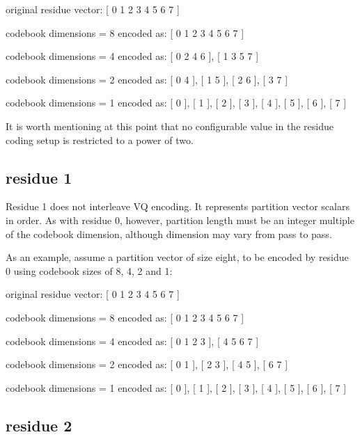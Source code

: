 \begin{programlisting}

            original residue vector: [ 0 1 2 3 4 5 6 7 ]

codebook dimensions = 8  encoded as: [ 0 1 2 3 4 5 6 7 ]

codebook dimensions = 4  encoded as: [ 0 2 4 6 ], [ 1 3 5 7 ]

codebook dimensions = 2  encoded as: [ 0 4 ], [ 1 5 ], [ 2 6 ], [ 3 7 ]

codebook dimensions = 1  encoded as: [ 0 ], [ 1 ], [ 2 ], [ 3 ], [ 4 ], [ 5 ], [ 6 ], [ 7 ]

\end{programlisting}

It is worth mentioning at this point that no configurable value in the
residue coding setup is restricted to a power of two.



\subsection{residue 1}

Residue 1 does not interleave VQ encoding.  It represents partition
vector scalars in order.  As with residue 0, however, partition length
must be an integer multiple of the codebook dimension, although
dimension may vary from pass to pass.

As an example, assume a partition vector of size eight, to be encoded
by residue 0 using codebook sizes of 8, 4, 2 and 1:

\begin{programlisting}

            original residue vector: [ 0 1 2 3 4 5 6 7 ]

codebook dimensions = 8  encoded as: [ 0 1 2 3 4 5 6 7 ]

codebook dimensions = 4  encoded as: [ 0 1 2 3 ], [ 4 5 6 7 ]

codebook dimensions = 2  encoded as: [ 0 1 ], [ 2 3 ], [ 4 5 ], [ 6 7 ]

codebook dimensions = 1  encoded as: [ 0 ], [ 1 ], [ 2 ], [ 3 ], [ 4 ], [ 5 ], [ 6 ], [ 7 ]

\end{programlisting}



\subsection{residue 2}

